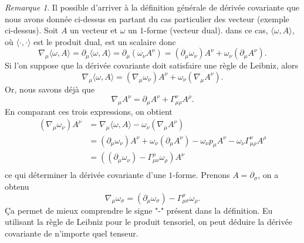 \documentclass[a4paper,11pt]{report}
\theoremstyle{definition}
\theoremstyle{plain}
\theoremstyle{definition}
\theoremstyle{remark}
\newtheorem{rmk}{Remarque}[chapter]
\newcommand{\p}{\partial}
\begin{document}
                \begin{rmk}
                    Il possible d'arriver à la définition générale de dérivée covariante que nous avons donnée ci-dessus en partant du cas particulier des vecteur (exemple ci-dessus).
                    Soit $A$ un vecteur et $\omega$ un $1$-forme (vecteur dual). dans ce cas, $\langle\omega,A\rangle$, où $\langle\cdot,\cdot\rangle$ est le produit dual, est un scalaire donc
                    \begin{equation}
                        \nabla_\mu\langle\omega,A\rangle = \p_\mu\langle\omega,A\rangle = \p_\mu (\omega_\nu A^\nu) = (\p_\mu \omega_\nu)A^\nu+\omega_\nu(\p_\mu A^\nu).
                    \end{equation}
                    Si l'on suppose que la dérivée covariante doit satisfaire une règle de Leibniz, alors
                    \begin{equation}
                        \nabla_\mu\langle\omega,A\rangle = (\nabla_\mu \omega_\nu)A^\nu+\omega_\nu(\nabla_\mu A^\nu).
                    \end{equation}
                    Or, nous savons déjà que
                    \begin{equation}
                        \nabla_\mu A^\nu = \p_\mu A^\nu+\Gamma^\nu_{\mu\rho}A^\rho.
                    \end{equation}
                    En comparant ces trois expressions, on obtient
                    \begin{align}
                        (\nabla_\mu \omega_\nu)A^\nu &= \nabla_\mu\langle\omega,A\rangle-\omega_\nu(\nabla_\mu A^\nu) \\
                        &= (\p_\mu \omega_\nu)A^\nu+\omega_\nu(\p_\mu A^\nu) - \omega_\nu p_\mu A^\nu-\omega_\nu\Gamma^\nu_{\mu\rho}A^\rho \\
                        &= \left((\p_\mu \omega_\nu)-\Gamma^\rho_{\mu\nu}\omega_\rho\right) A^\nu\\
                    \end{align}
                    ce qui déterminer la dérivée covariante d'une $1$-forme. Prenons $A = \p_\sigma$, on a obtenu
                    \begin{equation}
                        \nabla_\mu \omega_\sigma = (\p_\mu \omega_\sigma)-\Gamma^\rho_{\mu\sigma}\omega_\rho.
                    \end{equation}
                    Ça permet de mieux comprendre le signe "-" présent dans la définition. Eu utilisant la règle de Leibniz pour le produit tensoriel, on peut déduire la dérivée covariante de n'importe quel tenseur.
                \end{rmk}
                
\end{document}

